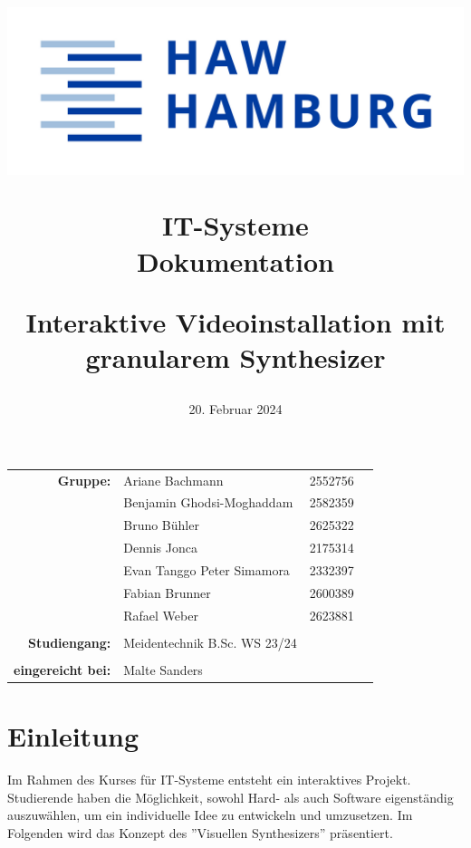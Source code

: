 \documentclass[12pt]{scrartcl}%
\title{
\begin{flushright}
 \includegraphics[scale=0.5]{HAW_Marke_RGB_300dpi.jpg}
\end{flushright}

\vspace{2cm}

IT-Systeme\\
Dokumentation
 
\vspace{1cm}

\LARGE Interaktive Videoinstallation mit\\
granularem Synthesizer
}
\date{20. Februar 2024}
\theoremstyle{nonumberplain}
\begin{document}
\begin{titlepage}


\maketitle %


\vfill 

\begin{flushleft}
\begin{tabular}{rlll}
\textbf{Gruppe:} & Ariane Bachmann & 2552756 & \hspace{5cm} \\
 & Benjamin Ghodsi-Moghaddam & 2582359 & \hspace{5cm} \\
 & Bruno Bühler & 2625322 & \hspace{5cm} \\
  & Dennis Jonca & 2175314 & \hspace{5cm} \\
   & Evan Tanggo Peter Simamora & 2332397 & \hspace{5cm} \\
    & Fabian Brunner &  2600389 & \hspace{5cm} \\
& Rafael Weber & 2623881 & \hspace{5cm} \\\\
\textbf{Studiengang:} & Meidentechnik B.Sc. WS 23/24 & \hspace{5cm} \\\\
\textbf{eingereicht bei:} & Malte Sanders & \hspace{5cm} \\ 
\end{tabular}
\end{flushleft}

\end{titlepage}

\tableofcontents

\newpage

\section{Einleitung}

Im Rahmen des Kurses für IT-Systeme entsteht ein interaktives Projekt. Studierende haben die Möglichkeit, sowohl Hard- als auch Software eigenständig auszuwählen, um ein individuelle Idee zu entwickeln und umzusetzen. Im Folgenden wird das Konzept des ''Visuellen Synthesizers'' präsentiert.
\end{document}
